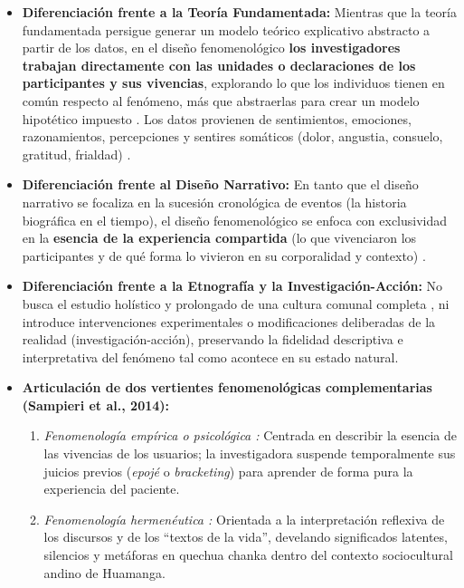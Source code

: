 \begin{itemize}
    \item \textbf{Diferenciación frente a la Teoría Fundamentada:} Mientras que la teoría fundamentada persigue generar un modelo teórico explicativo abstracto a partir de los datos, en el diseño fenomenológico \textbf{los investigadores trabajan directamente con las unidades o declaraciones de los participantes y sus vivencias}, explorando lo que los individuos tienen en común respecto al fenómeno, más que abstraerlas para crear un modelo hipotético impuesto \cite{sampieri2018}. Los datos provienen de sentimientos, emociones, razonamientos, percepciones y sentires somáticos (dolor, angustia, consuelo, gratitud, frialdad) \cite{benner2008, sampieri2018}.
    \item \textbf{Diferenciación frente al Diseño Narrativo:} En tanto que el diseño narrativo se focaliza en la sucesión cronológica de eventos (la historia biográfica en el tiempo), el diseño fenomenológico se enfoca con exclusividad en la \textbf{esencia de la experiencia compartida} (lo que vivenciaron los participantes y de qué forma lo vivieron en su corporalidad y contexto) \cite{sampieri2018}.
    \item \textbf{Diferenciación frente a la Etnografía y la Investigación-Acción:} No busca el estudio holístico y prolongado de una cultura comunal completa \cite{cotan2020}, ni introduce intervenciones experimentales o modificaciones deliberadas de la realidad (investigación-acción), preservando la fidelidad descriptiva e interpretativa del fenómeno tal como acontece en su estado natural.
    \item \textbf{Articulación de dos vertientes fenomenológicas complementarias (Sampieri et al., 2014):}
    \begin{enumerate}
        \item \textit{Fenomenología empírica o psicológica \cite{moustakas1994, creswell2013, wilson2007}:} Centrada en describir la esencia de las vivencias de los usuarios; la investigadora suspende temporalmente sus juicios previos (\textit{epojé} o \textit{bracketing}) para aprender de forma pura la experiencia del paciente.
        \item \textit{Fenomenología hermenéutica \cite{vanmanen1990, creswell2013}:} Orientada a la interpretación reflexiva de los discursos y de los ``textos de la vida'', develando significados latentes, silencios y metáforas en quechua chanka dentro del contexto sociocultural andino de Huamanga.
    \end{enumerate}
\end{itemize}

